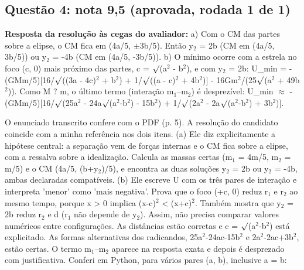 \documentclass{article}%
\begin{document}
\subsection*{Questão 4: nota 9,5 (aprovada, rodada 1 de 1)}%
\textbf{Resposta da resolução às cegas do avaliador:} a) Com o CM das partes sobre a elipse, o CM fica em (4a/5, $\pm$3b/5). Então y$_{2}$ = 2b (CM em (4a/5, 3b/5)) ou y$_{2}$ = -4b (CM em (4a/5, -3b/5)).\newline%
\newline%
b) O mínimo ocorre com a estrela no foco (c, 0) mais próximo das partes, c = $\surd$(a$^2$ - b$^2$), e com y$_{2}$ = 2b:\newline%
U\_min = -(GMm/5){[}16/$\surd$((3a - 4c)$^2$ + b$^2$) + 1/$\surd$((a - c)$^2$ + 4b$^2$){]} - 16Gm$^2$/(25$\surd$(a$^2$ + 49b$^2$)).\newline%
Como M ? m, o último termo (interação m$_{1}$--m$_{2}$) é desprezível:\newline%
U\_min $\approx$ -(GMm/5){[}16/$\surd$(25a$^2$ - 24a$\surd$(a$^2$-b$^2$) - 15b$^2$) + 1/$\surd$(2a$^2$ - 2a$\surd$(a$^2$-b$^2$) + 3b$^2$){]}.\par %
O enunciado transcrito confere com o PDF (p. 5). A resolução do candidato coincide com a minha referência nos dois itens.\newline%
\newline%
(a) Ele diz explicitamente a hipótese central: a separação vem de forças internas e o CM fica sobre a elipse, com a ressalva sobre a idealização. Calcula as massas certas (m$_{1}$ = 4m/5, m$_{2}$ = m/5) e o CM (4a/5, (b+y$_{2}$)/5), e encontra as duas soluções y$_{2}$ = 2b ou y$_{2}$ = -4b, ambas declaradas compatíveis.\newline%
\newline%
(b) Ele escreve U com os três pares de interação e interpreta 'menor' como 'mais negativa'. Prova que o foco (+c, 0) reduz r$_{1}$ e r$_{2}$ ao mesmo tempo, porque x > 0 implica (x-c)$^2$ < (x+c)$^2$. Também mostra que y$_{2}$ = 2b reduz r$_{2}$ e d (r$_{1}$ não depende de y$_{2}$). Assim, não precisa comparar valores numéricos entre configurações. As distâncias estão corretas e c = $\surd$(a$^2$-b$^2$) está explicitado. As formas alternativas dos radicandos, 25a$^2$-24ac-15b$^2$ e 2a$^2$-2ac+3b$^2$, estão certas. O termo m$_{1}$--m$_{2}$ aparece na resposta exata e depois é desprezado com justificativa.\newline%
\newline%
Conferi em Python, para vários pares (a, b), inclusive a = b:\newline%
\end{document}
